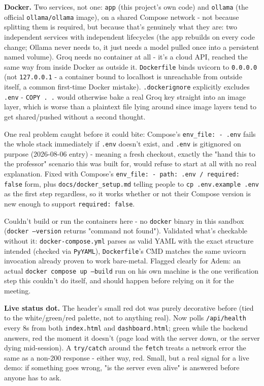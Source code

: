 \textbf{Docker.} Two services, not one: \texttt{app} (this project's own code) and \texttt{ollama} (the official \texttt{ollama/\allowbreak{}ollama} image), on a shared Compose network - not because splitting them is required, but because that's genuinely what they are: two independent services with independent lifecycles (the app rebuilds on every code change; Ollama never needs to, it just needs a model pulled once into a persistent named volume). Groq needs no container at all - it's a cloud API, reached the same way from inside Docker as outside it. \texttt{Dockerfile} binds uvicorn to \texttt{0.0.0.0} (not \texttt{127.0.0.1} - a container bound to localhost is unreachable from outside itself, a common first-time Docker mistake). \texttt{.dockerignore} explicitly excludes \texttt{.env} - \texttt{COPY . .} would otherwise bake a real Groq key straight into an image layer, which is worse than a plaintext file lying around since image layers tend to get shared/pushed without a second thought.

One real problem caught before it could bite: Compose's \texttt{env\_\allowbreak{}file: - .env} fails the whole stack immediately if \texttt{.env} doesn't exist, and \texttt{.env} is gitignored on purpose (2026-08-06 entry) - meaning a fresh checkout, exactly the "hand this to the professor" scenario this was built for, would refuse to start at all with no real explanation. Fixed with Compose's \texttt{env\_\allowbreak{}file: - path: .env /\allowbreak{} required: false} form, plus \texttt{docs/\allowbreak{}docker\_\allowbreak{}setup.md} telling people to \texttt{cp .env.example .env} as the first step regardless, so it works whether or not their Compose version is new enough to support \texttt{required: false}.

Couldn't build or run the containers here - no \texttt{docker} binary in this sandbox (\texttt{docker --version} returns "command not found"). Validated what's checkable without it: \texttt{docker-compose.yml} parses as valid YAML with the exact structure intended (checked via \texttt{PyYAML}), \texttt{Dockerfile}'s CMD matches the same uvicorn invocation already proven to work bare-metal. Flagged clearly for Adem: an actual \texttt{docker compose up --build} run on his own machine is the one verification step this couldn't do itself, and should happen before relying on it for the meeting.

\textbf{Live status dot.} The header's small red dot was purely decorative before (tied to the white/green/red palette, not to anything real). Now polls \texttt{/\allowbreak{}api/\allowbreak{}health} every 8s from both \texttt{index.html} and \texttt{dashboard.html}; green while the backend answers, red the moment it doesn't (page load with the server down, or the server dying mid-session). A \texttt{try/\allowbreak{}catch} around the \texttt{fetch} treats a network error the same as a non-200 response - either way, red. Small, but a real signal for a live demo: if something goes wrong, "is the server even alive" is answered before anyone has to ask.

